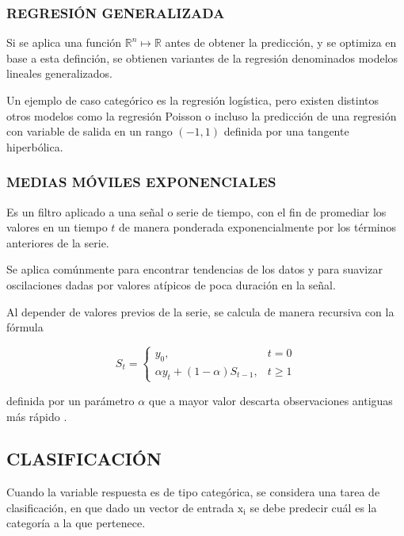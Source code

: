     	\vspace{-10mm}
    	\subsubsection{REGRESIÓN GENERALIZADA}
    		Si se aplica una función $\mathbb{R}^n\mapsto\mathbb{R}$ antes de obtener la predicción, y se optimiza en base a esta definción, se obtienen variantes de la regresión denominados modelos lineales generalizados.
    		
    		Un ejemplo de caso categórico es la regresión logística, pero existen distintos otros modelos como la regresión Poisson o incluso la predicción de una regresión con variable de salida en un rango $(-1, 1)$ definida por una tangente hiperbólica.
    		
    	\subsubsection{MEDIAS MÓVILES EXPONENCIALES}
    		Es un filtro aplicado a una señal o serie de tiempo, con el fin de promediar los valores en un tiempo $t$ de manera ponderada exponencialmente por los términos anteriores de la serie.
    		
    		Se aplica comúnmente para encontrar tendencias de los datos y para suavizar oscilaciones dadas por valores atípicos de poca duración en la señal.
    		
    		Al depender de valores previos de la serie, se calcula de manera recursiva con la fórmula
    		
    		\begin{equation}
    			S_t = \begin{cases}
    				y_0, & t=0\\
    				\alpha y_t + (1 - \alpha)S_{t-1}, & t \ge 1
    			\end{cases}
    		\end{equation}
    	
    		definida por un parámetro $\alpha$ que a mayor valor descarta observaciones antiguas más rápido \citep{10.5555/3002669}.
    	
    \subsection{CLASIFICACIÓN}
        Cuando la variable respuesta es de tipo categórica, se considera una tarea de clasificación, en que dado un vector de entrada $\mathrm{x_i}$ se debe predecir cuál es la categoría a la que pertenece. \citep{hastie01statisticallearning}
